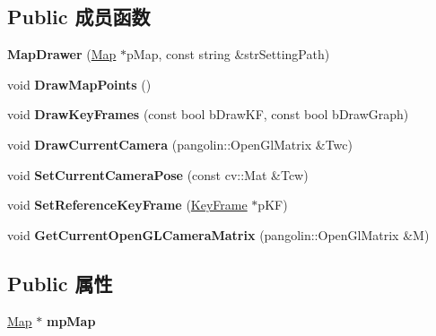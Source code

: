 \subsection*{Public 成员函数}
\begin{DoxyCompactItemize}
\item 
\hypertarget{classORB__SLAM2_1_1MapDrawer_a649a10671736e192e85a6d824d776fc1}{{\bfseries Map\-Drawer} (\hyperlink{classORB__SLAM2_1_1Map}{Map} $\ast$p\-Map, const string \&str\-Setting\-Path)}\label{classORB__SLAM2_1_1MapDrawer_a649a10671736e192e85a6d824d776fc1}

\item 
\hypertarget{classORB__SLAM2_1_1MapDrawer_a79991cc944076440e4ce4326436da285}{void {\bfseries Draw\-Map\-Points} ()}\label{classORB__SLAM2_1_1MapDrawer_a79991cc944076440e4ce4326436da285}

\item 
\hypertarget{classORB__SLAM2_1_1MapDrawer_a5e00f408c3c2d1878ca53930903caa5f}{void {\bfseries Draw\-Key\-Frames} (const bool b\-Draw\-K\-F, const bool b\-Draw\-Graph)}\label{classORB__SLAM2_1_1MapDrawer_a5e00f408c3c2d1878ca53930903caa5f}

\item 
\hypertarget{classORB__SLAM2_1_1MapDrawer_af8d3dec705fc048dac229cf682bfceb1}{void {\bfseries Draw\-Current\-Camera} (pangolin\-::\-Open\-Gl\-Matrix \&Twc)}\label{classORB__SLAM2_1_1MapDrawer_af8d3dec705fc048dac229cf682bfceb1}

\item 
\hypertarget{classORB__SLAM2_1_1MapDrawer_ac8c03502b5878303b31816ce5dfd9c0a}{void {\bfseries Set\-Current\-Camera\-Pose} (const cv\-::\-Mat \&Tcw)}\label{classORB__SLAM2_1_1MapDrawer_ac8c03502b5878303b31816ce5dfd9c0a}

\item 
\hypertarget{classORB__SLAM2_1_1MapDrawer_ac72cc0b3e9e3a92527b38ca12230e79c}{void {\bfseries Set\-Reference\-Key\-Frame} (\hyperlink{classORB__SLAM2_1_1KeyFrame}{Key\-Frame} $\ast$p\-K\-F)}\label{classORB__SLAM2_1_1MapDrawer_ac72cc0b3e9e3a92527b38ca12230e79c}

\item 
\hypertarget{classORB__SLAM2_1_1MapDrawer_a872b93687086460e398e912191c91aca}{void {\bfseries Get\-Current\-Open\-G\-L\-Camera\-Matrix} (pangolin\-::\-Open\-Gl\-Matrix \&M)}\label{classORB__SLAM2_1_1MapDrawer_a872b93687086460e398e912191c91aca}

\end{DoxyCompactItemize}
\subsection*{Public 属性}
\begin{DoxyCompactItemize}
\item 
\hypertarget{classORB__SLAM2_1_1MapDrawer_aa10e7a80919749c11774eb84219f0a4b}{\hyperlink{classORB__SLAM2_1_1Map}{Map} $\ast$ {\bfseries mp\-Map}}\label{classORB__SLAM2_1_1MapDrawer_aa10e7a80919749c11774eb84219f0a4b}

\end{DoxyCompactItemize}



